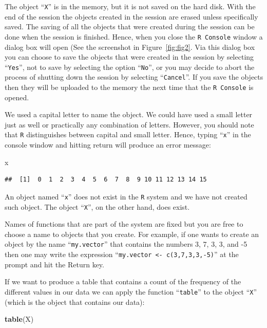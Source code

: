 \documentclass[]{krantz}
\makeatletter
\newenvironment{Shaded}{\begin{snugshade}}{\end{snugshade}}
\newcommand{\KeywordTok}[1]{\textcolor[rgb]{0.13,0.29,0.53}{\textbf{#1}}}
\newcommand{\NormalTok}[1]{#1}
\newenvironment{kframe}{%
\medskip{}
\setlength{\fboxsep}{.8em}
 \def\at@end@of@kframe{}%
 \ifinner\ifhmode%
  \def\at@end@of@kframe{\end{minipage}}%
  \begin{minipage}{\columnwidth}%
 \fi\fi%
 \def\FrameCommand##1{\hskip\@totalleftmargin \hskip-\fboxsep
 \colorbox{shadecolor}{##1}\hskip-\fboxsep
     \hskip-\linewidth \hskip-\@totalleftmargin \hskip\columnwidth}%
 \MakeFramed {\advance\hsize-\width
   \@totalleftmargin\z@ \linewidth\hsize
   \@setminipage}}%
 {\par\unskip\endMakeFramed%
 \at@end@of@kframe}
\renewenvironment{Shaded}{\begin{kframe}}{\end{kframe}}
\theoremstyle{definition}
\theoremstyle{definition}
\theoremstyle{definition}
\theoremstyle{remark}
\makeatother
\begin{document}
The object ``\texttt{X}'' is in the memory, but it is not saved on the
hard disk. With the end of the session the objects created in the
session are erased unless specifically saved. The saving of all the
objects that were created during the session can be done when the
session is finished. Hence, when you close the \texttt{R\ Console}
window a dialog box will open (See the screenshot in
Figure~\ref{fig:fig2}. Via this dialog box you can choose to save the
objects that were created in the session by selecting ``\texttt{Yes}'',
not to save by selecting the option ``\texttt{No}'', or you may decide
to abort the process of shutting down the session by selecting
``\texttt{Cancel}''. If you save the objects then they will be uploaded
to the memory the next time that the \texttt{R\ Console} is opened.

We used a capital letter to name the object. We could have used a small
letter just as well or practically any combination of letters. However,
you should note that \texttt{R} distinguishes between capital and small
letter. Hence, typing ``\texttt{x}'' in the console window and hitting
return will produce an error message:

\begin{Shaded}
\begin{Highlighting}[]
\NormalTok{x}
\end{Highlighting}
\end{Shaded}

\begin{verbatim}
##  [1]  0  1  2  3  4  5  6  7  8  9 10 11 12 13 14 15
\end{verbatim}

An object named ``\texttt{x}'' does not exist in the \texttt{R} system
and we have not created such object. The object ``\texttt{X}'', on the
other hand, does exist.

Names of functions that are part of the system are fixed but you are
free to choose a name to objects that you create. For example, if one
wants to create an object by the name ``\texttt{my.vector}'' that
contains the numbers 3, 7, 3, 3, and -5 then one may write the
expression ``\texttt{my.vector\ \textless{}-\ c(3,7,3,3,-5)}'' at the
prompt and hit the Return key.

If we want to produce a table that contains a count of the frequency of
the different values in our data we can apply the function
``\texttt{table}'' to the object ``\texttt{X}'' (which is the object
that contains our data):

\begin{Shaded}
\begin{Highlighting}[]
\KeywordTok{table}\NormalTok{(X)}
\end{Highlighting}
\end{Shaded}
\end{document}
